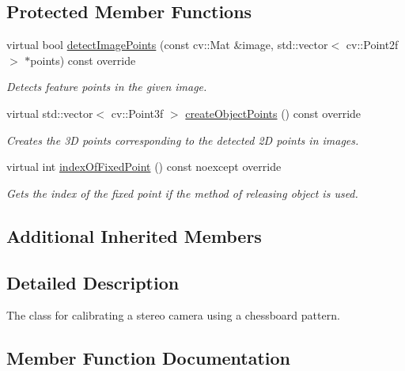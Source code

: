 \subsection*{Protected Member Functions}
\begin{DoxyCompactItemize}
\item 
virtual bool \hyperlink{classstereo__ugv_1_1ChessboardLensCalibrator_ac6e93519a72d4218bcb1f9a49a9c22eb}{detect\+Image\+Points} (const cv\+::\+Mat \&image, std\+::vector$<$ cv\+::\+Point2f $>$ $\ast$points) const override
\begin{DoxyCompactList}\small\item\em Detects feature points in the given image. \end{DoxyCompactList}\item 
virtual std\+::vector$<$ cv\+::\+Point3f $>$ \hyperlink{classstereo__ugv_1_1ChessboardLensCalibrator_adaeaa9e0a3203872ea8e5ef5b3482f7e}{create\+Object\+Points} () const override
\begin{DoxyCompactList}\small\item\em Creates the 3D points corresponding to the detected 2D points in images. \end{DoxyCompactList}\item 
virtual int \hyperlink{classstereo__ugv_1_1ChessboardLensCalibrator_a00aa88f3399b59ec686f6d506c73a910}{index\+Of\+Fixed\+Point} () const noexcept override
\begin{DoxyCompactList}\small\item\em Gets the index of the fixed point if the method of releasing object is used. \end{DoxyCompactList}\end{DoxyCompactItemize}
\subsection*{Additional Inherited Members}


\subsection{Detailed Description}
The class for calibrating a stereo camera using a chessboard pattern. 

\subsection{Member Function Documentation}
\mbox{\label{classstereo__ugv_1_1ChessboardLensCalibrator_adaeaa9e0a3203872ea8e5ef5b3482f7e}} 
